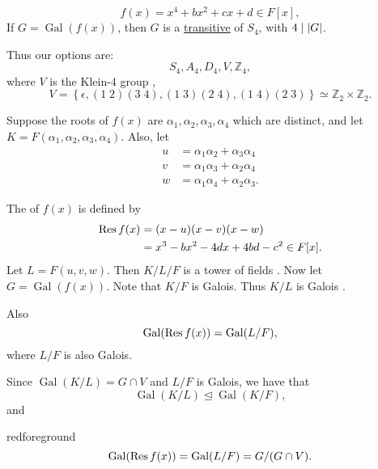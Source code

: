 \documentclass[notoc,notitlepage]{tufte-book}
\DeclareMathOperator{\Gal}{Gal}
\begin{document}
\begin{equation*}
  f(x) = x^4 + b x^2 + c x + d \in F[x],
\end{equation*}
If $G = \Gal(f(x))$, then $G$ is a
\hyperref[defn:transitive_subgroup]{transitive} of $S_4$, with $4 \mid \left|G\right|$.

Thus our options are:
\begin{equation*}
  S_4, A_4, D_4, V, \mathbb{Z}_4,
\end{equation*}
where $V$ is the Klein-$4$ group ,
\begin{equation*}
  V = \left\{ \epsilon, (1 \; 2)(3 \; 4), (1 \; 3)(2 \; 4), (1\; 4)(2 \; 3)
  \right\} \simeq \mathbb{Z}_2 \times \mathbb{Z}_2.
\end{equation*}

Suppose the roots of $f(x)$ are $\alpha_1, \alpha_2, \alpha_3, \alpha_4$ which
are distinct, and let $K = F(\alpha_1, \alpha_2, \alpha_3, \alpha_4)$. Also,
let
\begin{align*}
  u &= \alpha_1 \alpha_2 + \alpha_3 \alpha_4 \\
  v &= \alpha_1 \alpha_3 + \alpha_2 \alpha_4 \\
  w &= \alpha_1 \alpha_4 + \alpha_2 \alpha_3.
\end{align*}

The  of $f(x)$  is defined by
\begin{align*}
  \operatorname{Res} f(x) &= (x - u)(x - v)(x - w) \\
            &= x^3 - b x^2 - 4d x + 4bd - c^2 \in F[x].
\end{align*}
Let $L = F(u, v, w)$. Then $K / L / F$ is a tower of fields . Now
let $G = \Gal(f(x))$. Note that $K / F$ is Galois. Thus $K / L$ is Galois
.

Also
\begin{equation*}
  \Gal(\Res f(x)) = \Gal( L / F ),
\end{equation*}
where $L / F$ is also Galois.

Since $\Gal( K / L ) = G \cap V$ and $L / F$ is Galois, we have that
\begin{equation*}
  \Gal( K / L ) \trianglelefteq \Gal(K / F),
\end{equation*}
and
\begin{quotebox}{red}{foreground}
\begin{equation*}
  \Gal(\Res f(x)) = \Gal(L / F) = G / (G \cap V).
\end{equation*}
\end{quotebox}
\end{document}

